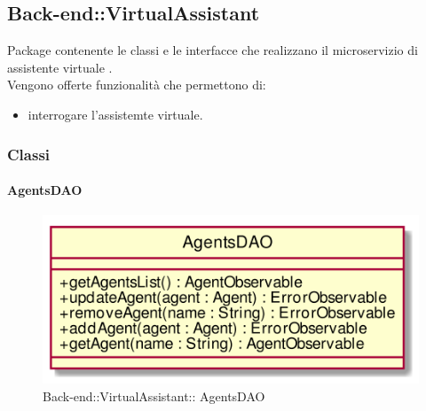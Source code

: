 \subsection{Back-end::VirtualAssistant}
Package contenente le classi e le interfacce che realizzano il microservizio di assistente virtuale .\\
Vengono offerte funzionalità che permettono di:
\begin{itemize}
\item interrogare l'assistemte virtuale.
\end{itemize}

\subsubsection{Classi}
\hypertarget{ AgentsDAO_label}{\paragraph{ AgentsDAO}}
\begin{figure}[h]
	\centering
	\includegraphics[width=\textwidth,height=\textheight,keepaspectratio]{images/Class_AgentsDAO.png}
	\caption{Back-end::VirtualAssistant:: AgentsDAO}
\end{figure}
